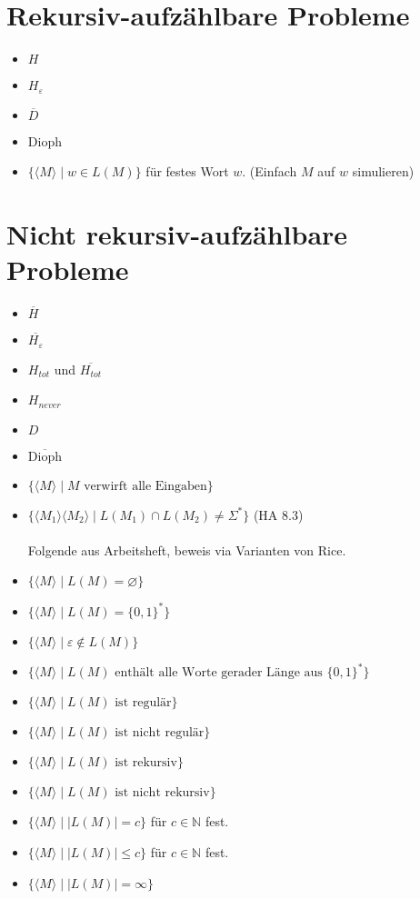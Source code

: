 \documentclass[a4paper,graphics,11pt]{article}
\newcommand{\eps}[0]{\varepsilon}
\newcommand{\godel}[1]{\langle #1 \rangle}
\begin{document}
\newpage

\section*{Rekursiv-aufzählbare Probleme}
\begin{itemize}
    \item $H$
    \item $H_\eps$
    \item $\overline{D}$
    \item Dioph
    \item $\{\godel{M}\mid w \in L(M)\}$ für festes Wort $w$.
        (Einfach $M$ auf $w$ simulieren)
\end{itemize}

\section*{Nicht rekursiv-aufzählbare Probleme}
\begin{itemize}
    \item $\overline{H}$
    \item $\overline{H_\eps}$
    \item $H_{tot}$ und $\overline{H_{tot}}$
    \item $H_{never}$
    \item $D$
    \item $\overline{\text{Dioph}}$
    \item $\{\godel{M} \mid M \text{ verwirft alle Eingaben}\}$
    \item $\{\godel{M_1}\godel{M_2} \mid L(M_1) \cap L(M_2) \neq \Sigma^*\}$ (HA 8.3)\\
    \\ Folgende aus Arbeitsheft, beweis via Varianten von Rice.
    \item $\{\godel{M} \mid L(M) = \varnothing\}$
    \item $\{\godel{M} \mid L(M) = \{0,1\}^*\}$
    \item $\{\godel{M} \mid \eps \notin L(M)\}$
    \item $\{\godel{M} \mid L(M) \text{ enthält alle Worte gerader Länge aus }\{0,1\}^* \}$
    \item $\{\godel{M} \mid L(M) \text{ ist regulär}\}$
    \item $\{\godel{M} \mid L(M) \text{ ist nicht regulär}\}$
    \item $\{\godel{M} \mid L(M) \text{ ist rekursiv}\}$
    \item $\{\godel{M} \mid L(M) \text{ ist nicht rekursiv}\}$
    \item $\{\godel{M} \mid |L(M)| = c\}$ für $c \in \mathbb{N}$ fest.
    \item $\{\godel{M} \mid |L(M)| \leq c\}$ für $c \in \mathbb{N}$ fest.
    \item $\{\godel{M} \mid |L(M)| = \infty\}$
\end{itemize}
\end{document}

